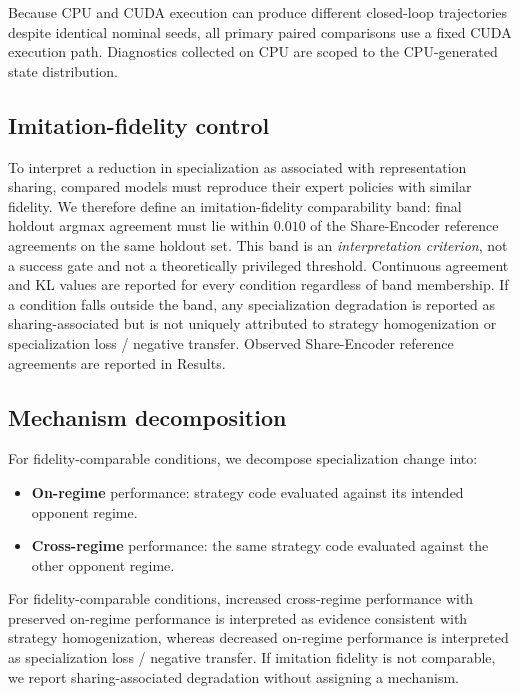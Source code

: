 \documentclass{article}
\begin{document}
Because CPU and CUDA execution can produce different closed-loop trajectories
despite identical nominal seeds, all primary paired comparisons use a fixed CUDA
execution path. Diagnostics collected on CPU are scoped to the CPU-generated
state distribution.

\subsection{Imitation-fidelity control}
\label{sec:fidelity}

To interpret a reduction in specialization as associated with representation
sharing, compared models must reproduce their expert policies with similar
fidelity. We therefore define an imitation-fidelity comparability band:
final holdout argmax agreement must lie within $0.010$ of the Share-Encoder
reference agreements on the same holdout set. This band is an
\emph{interpretation criterion}, not a success gate and not a theoretically
privileged threshold. Continuous agreement and KL values are reported for every
condition regardless of band membership. If a condition falls outside the band,
any specialization degradation is reported as sharing-associated but is not
uniquely attributed to strategy homogenization or specialization loss /
negative transfer. Observed Share-Encoder reference agreements are reported in
Results.

\subsection{Mechanism decomposition}
\label{sec:decomp}

For fidelity-comparable conditions, we decompose specialization change into:
\begin{itemize}
  \item \textbf{On-regime} performance: strategy code evaluated against its
  intended opponent regime.
  \item \textbf{Cross-regime} performance: the same strategy code evaluated
  against the other opponent regime.
\end{itemize}
For fidelity-comparable conditions, increased cross-regime performance with
preserved on-regime performance is interpreted as evidence consistent with
strategy homogenization, whereas decreased on-regime performance is interpreted
as specialization loss / negative transfer. If imitation fidelity is not
comparable, we report sharing-associated degradation without assigning a
mechanism.
\end{document}
